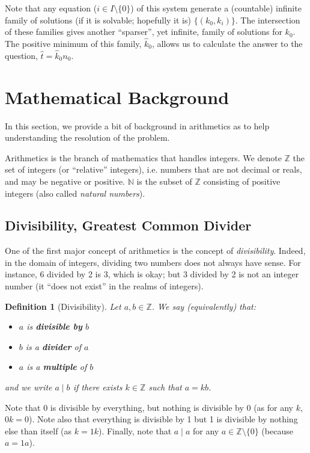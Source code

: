 \documentclass{article}
\newtheorem{definition}{Definition}
\newcommand{\divi}{\mathbin{\mid}}
\begin{document}
Note that any equation ($i \in I \setminus \{ 0 \}$) of this system generate a (countable) infinite family of solutions (if it is solvable; hopefully it is) $\{ (k_0,k_i) \}$. The intersection of these families gives another ``sparser'', yet infinite, family of solutions for $k_0$. The positive minimum of this family, $\hat k_0$, allows us to calculate the answer to the question, $\hat t = \hat k_0 n_0$.


\section{Mathematical Background}

In this section, we provide a bit of background in arithmetics as to help understanding the resolution of the problem.

Arithmetics is the branch of mathematics that handles integers. We denote $\mathbb{Z}$ the set of integers (or ``relative'' integers), i.e. numbers that are not decimal or reals, and may be negative or positive. $\mathbb{N}$ is the subset of $\mathbb{Z}$ consisting of positive integers (also called \textit{natural numbers}).

\subsection{Divisibility, Greatest Common Divider}

One of the first major concept of arithmetics is the concept of \textit{divisibility}. Indeed, in the domain of integers, dividing two numbers does not always have sense. For instance, 6 divided by 2 is 3, which is okay; but 3 divided by 2 is not an integer number (it ``does not exist'' in the realms of integers).

\begin{definition}[Divisibility]
Let $a,b \in \mathbb{Z}$. We say (equivalently) that:
\begin{itemize}
\item $a$ is \textbf{divisible by} $b$
\item $b$ is a \textbf{divider} of $a$
\item $a$ is a \textbf{multiple} of $b$
\end{itemize}
\noindent and we write $a \divi b$ if there exists $k \in \mathbb{Z}$ such that $a = k b$.
\end{definition}

Note that 0 is divisible by everything, but nothing is divisible by 0 (as for any $k$, $0 k = 0$). Note also that everything is divisible by 1 but 1 is divisible by nothing else than itself (as $k = 1 k$). Finally, note that $a \divi a$ for any $a \in \mathbb{Z} \setminus \{ 0 \}$ (because $a = 1 a$).
\end{document}
